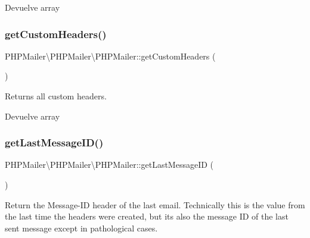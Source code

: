 \begin{DoxyReturn}{Devuelve}
array 
\end{DoxyReturn}
\mbox{\label{classPHPMailer_1_1PHPMailer_1_1PHPMailer_a69224d72c49c98a36da37f6fb15e461a}} 
\subsubsection{\texorpdfstring{get\+Custom\+Headers()}{getCustomHeaders()}}
{\footnotesize\ttfamily P\+H\+P\+Mailer\textbackslash{}\+P\+H\+P\+Mailer\textbackslash{}\+P\+H\+P\+Mailer\+::get\+Custom\+Headers (\begin{DoxyParamCaption}{ }\end{DoxyParamCaption})}

Returns all custom headers.

\begin{DoxyReturn}{Devuelve}
array 
\end{DoxyReturn}
\mbox{\label{classPHPMailer_1_1PHPMailer_1_1PHPMailer_ad53edfb7920dcd627f5f71e2a6584c15}} 
\subsubsection{\texorpdfstring{get\+Last\+Message\+I\+D()}{getLastMessageID()}}
{\footnotesize\ttfamily P\+H\+P\+Mailer\textbackslash{}\+P\+H\+P\+Mailer\textbackslash{}\+P\+H\+P\+Mailer\+::get\+Last\+Message\+ID (\begin{DoxyParamCaption}{ }\end{DoxyParamCaption})}

Return the Message-\/\+ID header of the last email. Technically this is the value from the last time the headers were created, but it\textquotesingle{}s also the message ID of the last sent message except in pathological cases.

